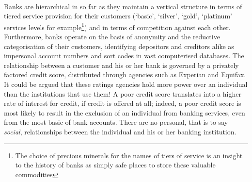 \documentclass[12pt,a4paper,titlepage]{article}
\begin{document}
\paragraph{}Banks are hierarchical in so far as they maintain a vertical structure in terms of tiered service provision for their customers (`basic', `silver', `gold', `platinum' services levels for example\footnote{The choice of precious minerals for the names of tiers of service is an insight to the history of banks as simply safe places to store these valuable commodities}) and in terms of competition against each other. Furthermore, banks operate on the basis of anonymity and the reductive categorisation of their customers, identifying depositors and creditors alike as impersonal account numbers and sort codes in vast computerised databases. The relationship between a customer and his or her bank is governed by a privately factored credit score, distributed through agencies such as Experian and Equifax. It could be argued that these ratings agencies hold more power over an individual than the institutions that use them! A poor credit score translates into a higher rate of interest for credit, if credit is offered at all; indeed, a poor credit score is most likely to result in the exclusion of an individual from banking services, even from the most basic of bank accounts. There are no personal, that is to say \textit{social}, relationships between the individual and his or her banking institution.
\end{document}
